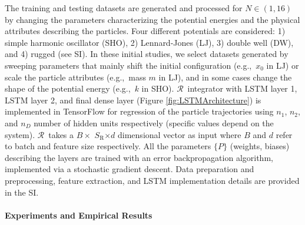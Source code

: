 \documentclass[aps,prl,twocolumn,superscriptaddress,tightenlines,longbibliography, reprint]{revtex4-1}
\newcommand{\eg}{e.g.,}
\newcommand{\R}{$\mathscr{R}$}
\newcommand{\SR}{$S_{\mathrm{R}}$}
\begin{document}
The training and testing datasets are generated and processed for $N \in (1,16)$ by changing the parameters characterizing the potential energies and the physical attributes describing the particles. Four different potentials are considered: 1) simple harmonic oscillator (SHO), 2) Lennard-Jones (LJ), 3) double well (DW), and 4) rugged (see SI). 
In these initial studies, we select  datasets generated by sweeping parameters that mainly shift the initial configuration (\eg\ $x_0$ in LJ) or scale the particle attributes (\eg\ mass $m$ in LJ), and in some cases change the shape of the potential energy (\eg\ $k$ in SHO).
\R\ integrator with  LSTM layer 1, LSTM layer 2, and final dense layer (Figure \ref{fig:LSTMArchitecture}) is implemented in TensorFlow for regression of the particle trajectories using $n_1$, $n_2$, and $n_D$ number of hidden units respectively (specific values depend on the system). 
\R\ takes a $B \times$ \SR $\times d$ dimensional vector as input where $B$ and $d$ refer to batch and feature size respectively.
All the parameters $\{P\}$ (weights, biases) describing the layers are trained with an error backpropagation algorithm, implemented via a stochastic gradient descent. 
Data preparation and preprocessing, feature extraction, and LSTM implementation details are provided in the SI. 

\paragraph{Experiments and Empirical Results}
\end{document}
